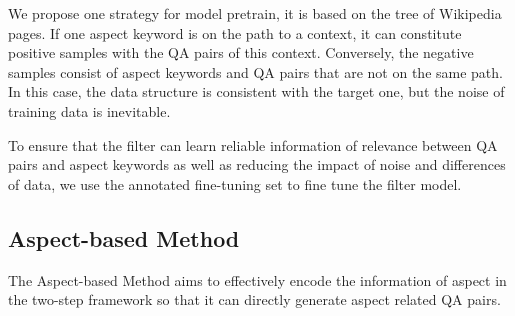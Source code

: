 We propose one strategy for model pretrain,
it is based on the tree of Wikipedia pages.
If one aspect keyword is on the path to a context, it can constitute positive samples with the QA pairs of this context.
Conversely, the negative samples consist of aspect keywords and QA pairs that are not on the same path.
In this case, the data structure is consistent with the target one, but the noise of training data is inevitable.

To ensure that the filter can learn reliable information of relevance between QA pairs and aspect keywords as well as reducing the impact of noise and differences of data, we use the annotated fine-tuning set to fine tune the filter model.





\subsection{Aspect-based Method}
The Aspect-based Method aims to effectively encode the information  of aspect in the two-step framework so that it can directly generate aspect related QA pairs.

